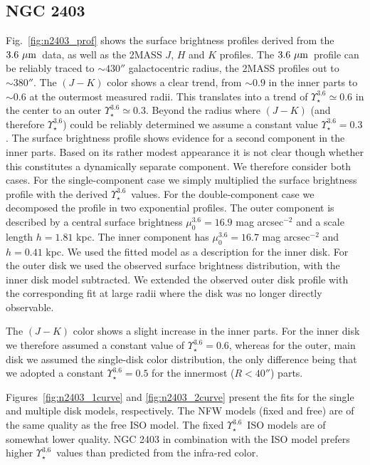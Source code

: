 \documentclass[usenatbib,usegraphicx,apjfonts,floatfix]{emulateapj}
\newcommand{\Ups}{\ensuremath{\Upsilon_{\star}^{3.6}}}
\newcommand{\tsm}{\ensuremath{3.6\ \mu{\rm m}}}
\begin{document}
\subsection{NGC 2403}

Fig.\ \ref{fig:n2403_prof} shows the surface brightness profiles
derived from the \tsm\ data, as well as the 2MASS $J$, $H$ and $K$
profiles. The \tsm\ profile can be reliably traced to $\sim 430''$
galactocentric radius, the 2MASS profiles out to $\sim 380''$.  The
$(J-K)$ color shows a clear trend, from $\sim 0.9$ in the inner parts
to $\sim 0.6$ at the outermost measured radii.  This translates into a
trend of $\Ups \simeq 0.6$ in the center to an outer $\Ups \simeq
0.3$. Beyond the radius where $(J-K)$ (and therefore \Ups) could be
reliably determined we assume a constant value $\Ups = 0.3$.
The surface brightness profile shows evidence for a second component
in the inner parts. Based on its rather modest appearance it is not
clear though whether this constitutes a dynamically separate
component. We therefore consider both cases. For the single-component
case we simply multiplied the surface brightness profile with the
derived \Ups\ values. For the double-component case we decomposed the
profile in two exponential profiles. The outer component is
described by a central surface brightness $\mu_0^{3.6} = 16.9$ mag
arcsec$^{-2}$ and a scale length $h = 1.81$ kpc.  The inner component
has $\mu_0^{3.6} = 16.7$ mag arcsec$^{-2}$ and $h= 0.41$ kpc.  We
used the fitted model as a description for the inner disk. For
the outer disk we used the observed surface brightness distribution,
with the inner disk model subtracted. We extended the observed outer
disk profile with the corresponding fit at large radii where the disk
was no longer directly observable.

The $(J-K)$ color shows a slight increase in the inner parts. For the
inner disk we therefore assumed a constant value of $\Ups = 0.6$,
whereas for the outer, main disk we assumed the single-disk color
distribution, the only difference being that we adopted a constant
$\Ups = 0.5$ for the innermost ($R<40''$) parts.

Figures~\ref{fig:n2403_1curve} and \ref{fig:n2403_2curve} present the
fits for the single and multiple disk models, respectively. The NFW
models (fixed and free) are of the same quality as the free ISO model.
The fixed \Ups\ ISO models are of somewhat lower quality. NGC 2403 in
combination with the ISO model prefers higher \Ups\ values than
predicted from the infra-red color.
\end{document}
